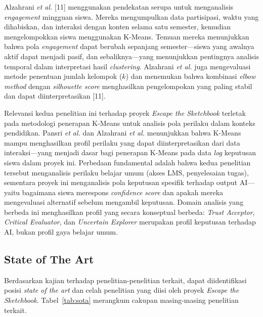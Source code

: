 \documentclass[10pt,twoside,openright]{report}
\begin{document}
Alzahrani \textit{et al.} [11] menggunakan pendekatan serupa untuk menganalisis \textit{engagement} mingguan siswa. Mereka mengumpulkan data partisipasi, waktu yang dihabiskan, dan interaksi dengan konten selama satu semester, kemudian mengelompokkan siswa menggunakan K-Means. Temuan mereka menunjukkan bahwa pola \textit{engagement} dapat berubah sepanjang semester—siswa yang awalnya aktif dapat menjadi pasif, dan sebaliknya—yang menunjukkan pentingnya analisis temporal dalam interpretasi hasil \textit{clustering}. Alzahrani \textit{et al.} juga mengevaluasi metode penentuan jumlah kelompok ($k$) dan menemukan bahwa kombinasi \textit{elbow method} dengan \textit{silhouette score} menghasilkan pengelompokan yang paling stabil dan dapat diinterpretasikan [11].

Relevansi kedua penelitian ini terhadap proyek \textit{Escape the Sketchbook} terletak pada metodologi penerapan K-Means untuk analisis pola perilaku dalam konteks pendidikan. Pansri \textit{et al.} dan Alzahrani \textit{et al.} menunjukkan bahwa K-Means mampu menghasilkan profil perilaku yang dapat diinterpretasikan dari data interaksi—yang menjadi dasar bagi penerapan K-Means pada data \textit{log} keputusan siswa dalam proyek ini. Perbedaan fundamental adalah bahwa kedua penelitian tersebut menganalisis perilaku belajar umum (akses LMS, penyelesaian tugas), sementara proyek ini menganalisis pola keputusan spesifik terhadap output AI—yaitu bagaimana siswa merespons \textit{confidence score} dan apakah mereka mengevaluasi alternatif sebelum mengambil keputusan. Domain analisis yang berbeda ini menghasilkan profil yang secara konseptual berbeda: \textit{Trust Acceptor}, \textit{Critical Evaluator}, dan \textit{Uncertain Explorer} merupakan profil keputusan terhadap AI, bukan profil gaya belajar umum.

\subsection{State of The Art}
\label{subsec:state-of-the-art}

Berdasarkan kajian terhadap penelitian-penelitian terkait, dapat diidentifikasi posisi \textit{state of the art} dan celah penelitian yang diisi oleh proyek \textit{Escape the Sketchbook}. Tabel~\ref{tab:sota} merangkum cakupan masing-masing penelitian terkait.
\end{document}
